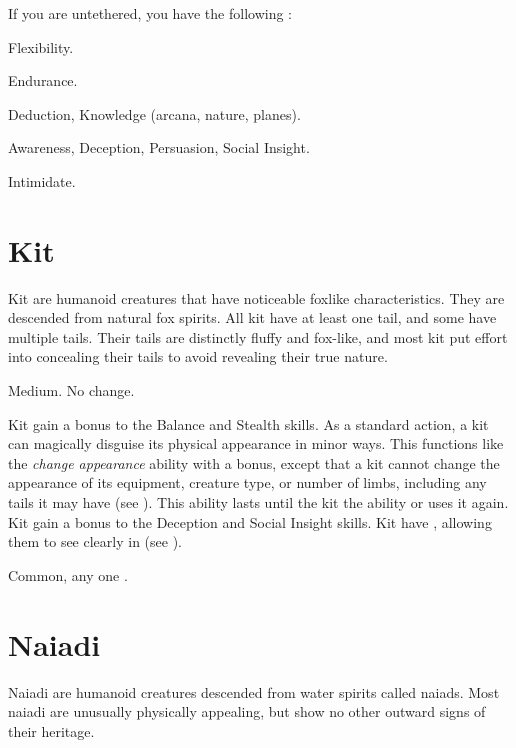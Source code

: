       If you are untethered, you have the following :
      \begin{raggeditemize}
        \item {} Flexibility.
        \item {} Endurance.
        \item {} Deduction, Knowledge (arcana, nature, planes).
        \item {} Awareness, Deception, Persuasion, Social Insight.
        \item {} Intimidate.
      \end{raggeditemize}

\section{Kit}

  Kit are humanoid creatures that have noticeable foxlike characteristics.
  They are descended from natural fox spirits.
  All kit have at least one tail, and some have multiple tails.
  Their tails are distinctly fluffy and fox-like, and most kit put effort into concealing their tails to avoid revealing their true nature.

   Medium.
   No change.
  \begin{raggeditemize}
     Kit gain a  bonus to the Balance and Stealth skills.
     As a standard action, a kit can magically disguise its physical appearance in minor ways.
      This functions like the \textit{change appearance} ability with a  bonus, except that a kit cannot change the appearance of its equipment, creature type, or number of limbs, including any tails it may have (see ).
      This ability lasts until the kit  the ability or uses it again.
     Kit gain a  bonus to the Deception and Social Insight skills.
     Kit have , allowing them to see clearly in  (see ).
  \end{raggeditemize}
   Common, any one .

\section{Naiadi}
  Naiadi are humanoid creatures descended from water spirits called naiads.
  Most naiadi are unusually physically appealing, but show no other outward signs of their heritage.

